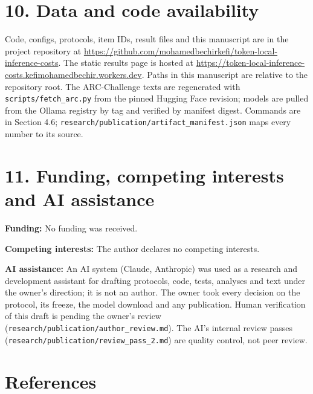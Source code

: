 \documentclass[
]{article}
\begin{document}
\section{10. Data and code
availability}\label{data-and-code-availability}

Code, configs, protocols, item IDs, result files and this manuscript are
in the project repository at
\url{https://github.com/mohamedbechirkefi/token-local-inference-costs}.
The static results page is hosted at
\url{https://token-local-inference-costs.kefimohamedbechir.workers.dev}.
Paths in this manuscript are relative to the repository root. The
ARC-Challenge texts are regenerated with \texttt{scripts/fetch\_arc.py}
from the pinned Hugging Face revision; models are pulled from the Ollama
registry by tag and verified by manifest digest. Commands are in Section
4.6; \texttt{research/publication/artifact\_manifest.json} maps every
number to its source.

\section{11. Funding, competing interests and AI
assistance}\label{funding-competing-interests-and-ai-assistance}

\textbf{Funding:} No funding was received.

\textbf{Competing interests:} The author declares no competing
interests.

\textbf{AI assistance:} An AI system (Claude, Anthropic) was used as a
research and development assistant for drafting protocols, code, tests,
analyses and text under the owner's direction; it is not an author. The
owner took every decision on the protocol, its freeze, the model
download and any publication. Human verification of this draft is
pending the owner's review
(\texttt{research/publication/author\_review.md}). The AI's internal
review passes (\texttt{research/publication/review\_pass\_2.md}) are
quality control, not peer review.

\section{References}\label{references}
\end{document}
